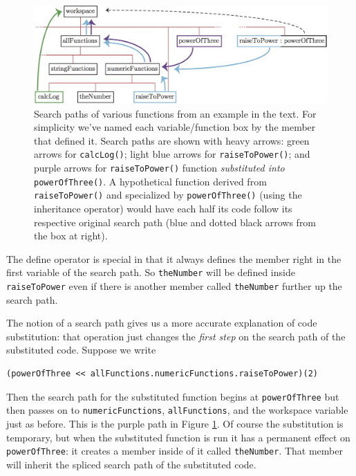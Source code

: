 \documentclass{article}
\newenvironment{code}{
       \begin{list}{}{
               \setlength{\leftmargin}{.4in}
               \setlength{\rightmargin}{0in}
               \setlength{\topsep}{.2in}
       }
       \small
       \item[] }
       { \end{list}   }
\begin{document}
\begin{figure}
\centering
\includegraphics[width=\textwidth]{searchPaths}
\caption{Search paths of various functions from an example in the text.  For simplicity we've named each variable/function box by the member that defined it.  Search paths are shown with heavy arrows:  green arrows for \texttt{calcLog()}; light blue arrows for \texttt{raiseToPower()}; and purple arrows for \texttt{raiseToPower()} function \emph{substituted into} \texttt{powerOfThree()}.  A hypothetical function derived from \texttt{raiseToPower()} and specialized by \texttt{powerOfThree()} (using the inheritance operator) would have each half its code follow its respective original search path (blue and dotted black arrows from the box at right).}
\label{searchPaths}
\end{figure}

The define operator is special in that it always defines the member right in the first variable of the search path.  So \verb#theNumber# will be defined inside \verb#raiseToPower# even if there is another member called \verb#theNumber# further up the search path.

The notion of a search path gives us a more accurate explanation of code substitution:  that operation just changes the \emph{first step} on the search path of the substituted code.  Suppose we write

\begin{code} \begin{verbatim}
(powerOfThree << allFunctions.numericFunctions.raiseToPower)(2)
\end{verbatim} \end{code}

\noindent Then the search path for the substituted function begins at \verb#powerOfThree# but then passes on to \verb#numericFunctions#, \verb#allFunctions#, and the workspace variable just as before.  This is the purple path in Figure \ref{searchPaths}.  Of course the substitution is temporary, but when the substituted function is run it has a permanent effect on \verb#powerOfThree#:  it creates a member inside of it called \verb#theNumber#.  That member will inherit the spliced search path of the substituted code.
\end{document}
